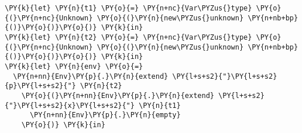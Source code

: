 \begin{Verbatim}[commandchars=\\\{\}]
\PY{k}{let} \PY{n}{t1} \PY{o}{=} \PY{n+nc}{Var\PYZus{}type} \PY{o}{(}\PY{n+nc}{Unknown} \PY{o}{(}\PY{n}{new\PYZus{}unknown} \PY{n+nb+bp}{()}\PY{o}{)}\PY{o}{)} \PY{k}{in}
\PY{k}{let} \PY{n}{t2} \PY{o}{=} \PY{n+nc}{Var\PYZus{}type} \PY{o}{(}\PY{n+nc}{Unknown} \PY{o}{(}\PY{n}{new\PYZus{}unknown} \PY{n+nb+bp}{()}\PY{o}{)}\PY{o}{)} \PY{k}{in}
\PY{k}{let} \PY{n}{env} \PY{o}{=}
  \PY{n+nn}{Env}\PY{p}{.}\PY{n}{extend} \PY{l+s+s2}{"}\PY{l+s+s2}{p}\PY{l+s+s2}{"} \PY{n}{t2}
    \PY{o}{(}\PY{n+nn}{Env}\PY{p}{.}\PY{n}{extend} \PY{l+s+s2}{"}\PY{l+s+s2}{x}\PY{l+s+s2}{"} \PY{n}{t1}
      \PY{n+nn}{Env}\PY{p}{.}\PY{n}{empty}
    \PY{o}{)} \PY{k}{in}
\end{Verbatim}
